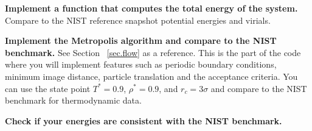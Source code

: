 \documentclass[aip,jcp,preprint,superscriptaddress,floatfix]{revtex4-1}
\begin{document}
\textbf{Implement a function that computes the total energy of the system. } 
Compare to the NIST reference snapshot potential energies and virials.

\textbf{Implement the Metropolis algorithm and compare to the NIST
benchmark. } See Section ~\ref{sec.flow} as
a reference. This is the part of the code where you will implement
features such as periodic boundary conditions, minimum image distance, 
particle translation and the acceptance criteria. You can use the state point
$T^* = 0.9$, $\rho^* = 0.9$, and $r_c = 3\sigma$  and compare to the
NIST benchmark for thermodynamic data.

\textbf{Check if your energies are consistent with the NIST benchmark. }


\newpage
%


\end{document}
